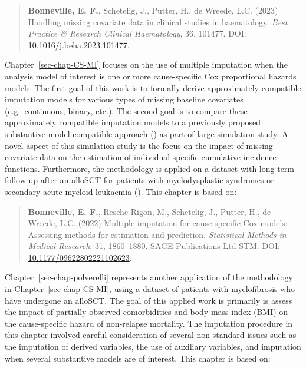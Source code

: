 \documentclass[
  letterpaper,
  paper=240mm:170mm,
  twoside=true,
  open=right,
  fontsize=10pt,
  pagesize=false,
  BCOR=15mm,
  DIV=14,
  headinclude=true,
  footinclude=false,
  headsepline=on]{scrbook}
\begin{document}
\begin{quote}
\textbf{Bonneville, E. F.}, Schetelig, J., Putter, H., de Wreede, L.C.
(2023) Handling missing covariate data in clinical studies in
haematology. \emph{Best Practice \& Research Clinical Haematology}, 36,
101477. DOI:
\href{https://doi.org/10.1016/j.beha.2023.101477}{10.1016/j.beha.2023.101477}.
\end{quote}

Chapter~\ref{sec-chap-CS-MI} focuses on the use of multiple imputation
when the analysis model of interest is one or more cause-specific Cox
proportional hazards models. The first goal of this work is to formally
derive approximately compatible imputation models for various types of
missing baseline covariates (e.g.~continuous, binary, etc.). The second
goal is to compare these approximately compatible imputation models to a
previously proposed substantive-model-compatible approach
() as part of large simulation study. A novel aspect of this
simulation study is the focus on the impact of missing covariate data on
the estimation of individual-specific cumulative incidence functions.
Furthermore, the methodology is applied on a dataset with long-term
follow-up after an alloSCT for patients with myelodysplastic syndromes
or secondary acute myeloid leukaemia
(). This chapter is based on:

\begin{quote}
\textbf{Bonneville, E. F.}, Resche-Rigon, M., Schetelig, J., Putter, H.,
de Wreede, L.C. (2022) Multiple imputation for cause-specific Cox
models: Assessing methods for estimation and prediction.
\emph{Statistical Methods in Medical Research}, 31, 1860--1880. SAGE
Publications Ltd STM. DOI:
\href{https://doi.org/10.1177/09622802221102623}{10.1177/09622802221102623}.
\end{quote}

Chapter~\ref{sec-chap-polverelli} represents another application of the
methodology in Chapter~\ref{sec-chap-CS-MI}, using a dataset of patients
with myelofibrosis who have undergone an alloSCT. The goal of this
applied work is primarily is assess the impact of partially observed
comorbidities and body mass index (BMI) on the cause-specific hazard of
non-relapse mortality. The imputation procedure in this chapter involved
careful consideration of several non-standard issues such as the
imputation of derived variables, the use of auxiliary variables, and
imputation when several substantive models are of interest. This chapter
is based on:
\end{document}

